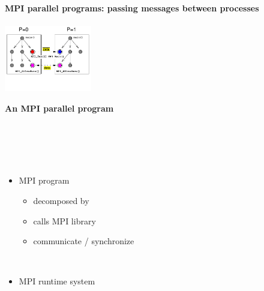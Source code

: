 \NEWSEC

\subsection{\ssCharm}

\begin{frame}[fragile,label=ss-charm] 
\secframetitle{\ssCharm}
\framesubtitle{MPI parallel programs: passing messages between processes}
\begin{minipage}[t]{1.75in}
\begin{center}
\begin{minipage}{1.50in}
\includegraphics[width=1.50in]{mpi.pdf}\\
\vspace{-0.5in}
\centerline{\scriptsize\textbf{An MPI parallel program}}
\end{minipage}\\ \ \\
\end{center}
\end{minipage} \ 
\begin{minipage}[t]{2.50in}
\vspace{-0.6in}
\begin{itemize}
\item MPI program
  \begin{itemize}
  \item decomposed by 
  \item calls MPI library
  \item communicate / synchronize
  \end{itemize}
\ \\ \pause
\item MPI runtime system

\end{itemize}
\end{minipage}
\end{frame}
